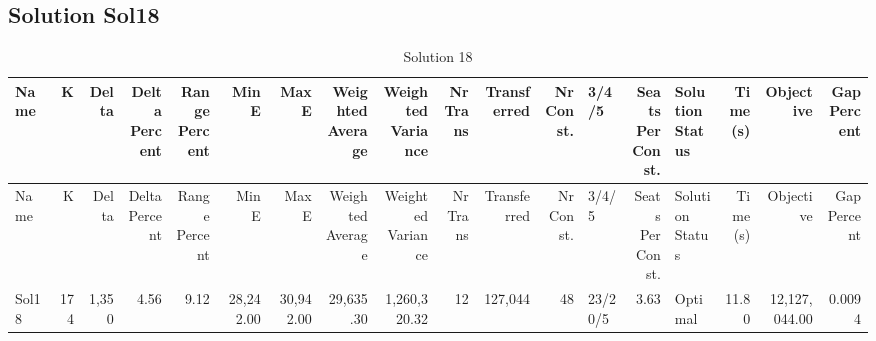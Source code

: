 \documentclass[a4paper]{article}
\begin{document}
\clearpage
\subsection{Solution Sol18}

{\scriptsize
\begin{longtable}{lrrrrrrrrrrrlrlrrr}
\caption{Solution 18}
\\ \toprule
Name &K &Delta &\shortstack{Delta\\Percent} &\shortstack{Range\\Percent} &Min E &Max E &\shortstack{Weighted\\Average} &\shortstack{Weighted\\Variance} &\shortstack{Nr\\Trans} &Transferred &\shortstack{Nr\\Const.} &3/4/5 &\shortstack{Seats\\Per\\Const.} &\shortstack{Solution\\Status} &\shortstack{Time\\(s)} &Objective &\shortstack{Gap\\Percent} \\ \midrule
\endfirsthead
\toprule
Name &K &Delta &\shortstack{Delta\\Percent} &\shortstack{Range\\Percent} &Min E &Max E &\shortstack{Weighted\\Average} &\shortstack{Weighted\\Variance} &\shortstack{Nr\\Trans} &Transferred &\shortstack{Nr\\Const.} &3/4/5 &\shortstack{Seats\\Per\\Const.} &\shortstack{Solution\\Status} &\shortstack{Time\\(s)} &Objective &\shortstack{Gap\\Percent} \\ \midrule
\endhead
\bottomrule
\endfoot
Sol18&174&1,350& 4.56& 9.12&28,242.00&30,942.00&29,635.30&1,260,320.32&12&127,044&48&23/20/5& 3.63&Optimal&11.80&12,127,044.00&0.0094\\ 
\end{longtable}

}
\end{document}
